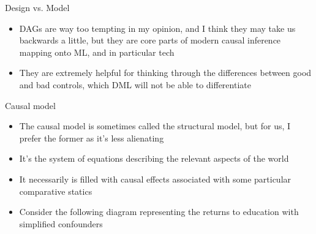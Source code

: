 \documentclass{beamer}
\begin{document}
\begin{frame}{Design vs. Model}

  \begin{itemize}
    \item DAGs are way too tempting in my opinion, and I think they may take us backwards a little, but they are core parts of modern causal inference mapping onto ML, and in particular tech
	\item They are extremely helpful for thinking through the differences between good and bad controls, which DML will not be able to differentiate
  \end{itemize}

\end{frame}



\begin{frame}{Causal model}

  \begin{itemize}
    \item The causal model is sometimes called the structural model, but for us, I prefer the former as it's less alienating
    \item It's the system of equations describing the relevant aspects of the world
    \item It necessarily is filled with causal effects associated with some particular comparative statics
    \item Consider the following diagram representing the returns to education with simplified confounders
  \end{itemize}

\end{frame}
\end{document}
